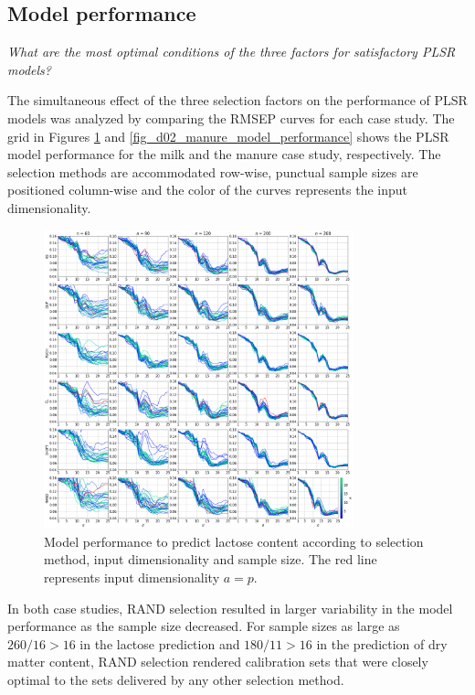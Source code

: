 \documentclass[journal=ancham,manuscript=article]{achemso}
\begin{document}
\subsection{Model performance}\label{results:modperformance}


\emph{What are the most optimal conditions of the three factors for satisfactory PLSR models?}

The simultaneous effect of the three selection factors on the performance of PLSR models was analyzed by comparing the RMSEP curves for each case study. The grid in Figures \ref{fig_d01_milk_model_performance} and \ref{fig_d02_manure_model_performance} shows the PLSR model performance for the milk and the manure case study, respectively. The selection methods are accommodated row-wise, punctual sample sizes are positioned column-wise and the color of the curves represents the input dimensionality. 


\begin{figure}[H]
\includegraphics[width=0.8\textwidth]{manuscript/figures/d01_milk_model_performance.png}
\centering
\caption{Model performance to predict lactose content according to selection method, input dimensionality and sample size. The red line represents input dimensionality $a=p$.}
\label{fig_d01_milk_model_performance}
\end{figure}

In both case studies, RAND selection resulted in larger variability in the model performance as the sample size decreased. For sample sizes as large as $260/16 > 16$ in the lactose prediction and $180/11 > 16$ in the prediction of dry matter content, RAND selection rendered calibration sets that were closely optimal to the sets delivered by any other selection method. 
\end{document}
